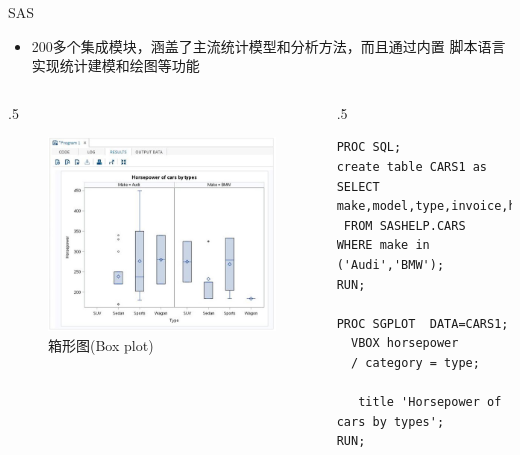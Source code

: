 \documentclass{beamerthemeMono}
\begin{document}
\begin{frame}[t, fragile]{\subsecname}{SAS}
  \begin{itemize}
    \item 200多个集成模块，涵盖了主流统计模型和分析方法，而且通过内置
           脚本语言实现统计建模和绘图等功能
  \end{itemize}
 
      \begin{columns}
        \begin{column}{.5\textwidth}
          \begin{figure}
            \centering
            \includegraphics[width=0.8\columnwidth]{sas_boxplot.png}
            \caption{箱形图(Box plot)}
          \end{figure}
        \end{column}

        \begin{column}{.5\textwidth}
\begin{lstlisting}[language=SAS]
PROC SQL;
create table CARS1 as
SELECT make,model,type,invoice,horsepower,length,weight
 FROM SASHELP.CARS
WHERE make in ('Audi','BMW');
RUN;

PROC SGPLOT  DATA=CARS1;
  VBOX horsepower 
  / category = type;

   title 'Horsepower of cars by types';
RUN; 
\end{lstlisting}
        \end{column}
      \end{columns}
\end{frame}
\end{document}

